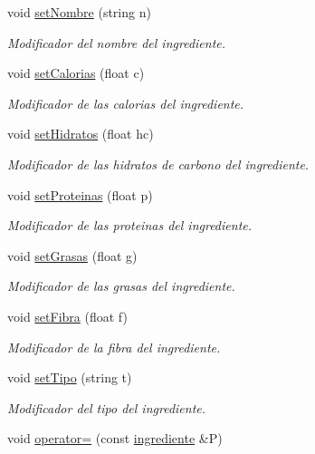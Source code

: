 \begin{DoxyCompactItemize}
void \hyperlink{classingrediente_aac5aba3c36aa762c72a8bc38271e4c12}{set\+Nombre} (string n)
\begin{DoxyCompactList}\small\item\em Modificador del nombre del ingrediente. \end{DoxyCompactList}\item 
void \hyperlink{classingrediente_af2f59af7fe9bf623fc6e9fa4e6da5fac}{set\+Calorias} (float c)
\begin{DoxyCompactList}\small\item\em Modificador de las calorias del ingrediente. \end{DoxyCompactList}\item 
void \hyperlink{classingrediente_ab678b69e2374ae25439162e4288d1e8a}{set\+Hidratos} (float hc)
\begin{DoxyCompactList}\small\item\em Modificador de las hidratos de carbono del ingrediente. \end{DoxyCompactList}\item 
void \hyperlink{classingrediente_a5ee4fac5c35f8ff71e7f974d1675a626}{set\+Proteinas} (float p)
\begin{DoxyCompactList}\small\item\em Modificador de las proteinas del ingrediente. \end{DoxyCompactList}\item 
void \hyperlink{classingrediente_a5b20e7a788dcdb5685c66c7362d65533}{set\+Grasas} (float g)
\begin{DoxyCompactList}\small\item\em Modificador de las grasas del ingrediente. \end{DoxyCompactList}\item 
void \hyperlink{classingrediente_a13928358db435d4a42b348f6ea1ee548}{set\+Fibra} (float f)
\begin{DoxyCompactList}\small\item\em Modificador de la fibra del ingrediente. \end{DoxyCompactList}\item 
void \hyperlink{classingrediente_ae51c71ad615844974ee24bb2fe9c7b80}{set\+Tipo} (string t)
\begin{DoxyCompactList}\small\item\em Modificador del tipo del ingrediente. \end{DoxyCompactList}\item 
void \hyperlink{classingrediente_a0556714d34bdd366599fc02758b6d046}{operator=} (const \hyperlink{classingrediente}{ingrediente} \&P)

\end{DoxyCompactItemize}
